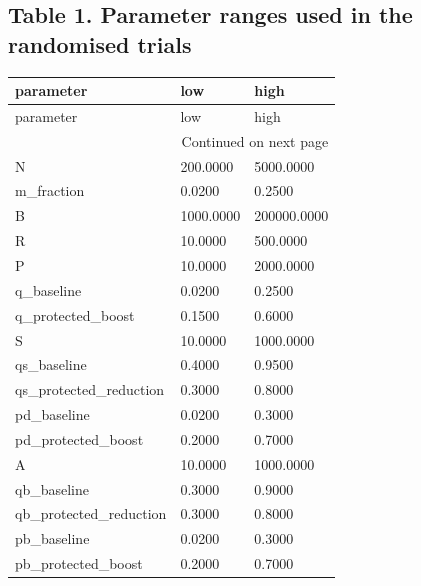 \documentclass[11pt,a4paper]{article}
\begin{document}
\subsection*{Table 1. Parameter ranges used in the randomised trials}
{\small
\setlength{\tabcolsep}{3pt}
\begin{longtable}{lll}
\toprule
parameter & low & high \\
\midrule
\endfirsthead
\toprule
parameter & low & high \\
\midrule
\endhead
\midrule
\multicolumn{3}{r}{Continued on next page} \\
\midrule
\endfoot
\bottomrule
\endlastfoot
N & 200.0000 & 5000.0000 \\
m\_fraction & 0.0200 & 0.2500 \\
B & 1000.0000 & 200000.0000 \\
R & 10.0000 & 500.0000 \\
P & 10.0000 & 2000.0000 \\
q\_baseline & 0.0200 & 0.2500 \\
q\_protected\_boost & 0.1500 & 0.6000 \\
S & 10.0000 & 1000.0000 \\
qs\_baseline & 0.4000 & 0.9500 \\
qs\_protected\_reduction & 0.3000 & 0.8000 \\
pd\_baseline & 0.0200 & 0.3000 \\
pd\_protected\_boost & 0.2000 & 0.7000 \\
A & 10.0000 & 1000.0000 \\
qb\_baseline & 0.3000 & 0.9000 \\
qb\_protected\_reduction & 0.3000 & 0.8000 \\
pb\_baseline & 0.0200 & 0.3000 \\
pb\_protected\_boost & 0.2000 & 0.7000 \\
\end{longtable}

}
\vspace{8pt}
\end{document}
